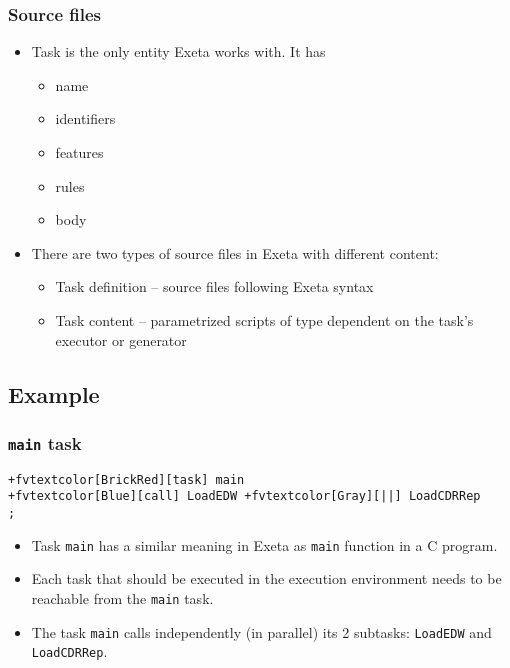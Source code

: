 \documentclass[english,xcolor={dvipsnames}]{beamer}
\begin{document}
\begin{frame}
\frametitle{Source files}
\begin{itemize}
    \item Task is the only entity Exeta works with. It has
    \begin{itemize}
        \item name
        \item identifiers
        \item features
        \item rules
        \item body
    \end{itemize}
    \item There are two types of source files in Exeta with different content:
    \begin{itemize}
        \item Task definition -- source files following Exeta syntax %
        \item Task content -- parametrized scripts of type dependent on the task's executor or generator %
    \end{itemize}
\end{itemize}
\end{frame}

\subsection{Example}

\begin{frame}[fragile]
\frametitle{\texttt{main} task}
\begin{Verbatim}[commandchars=+\[\]]
+fvtextcolor[BrickRed][task] main
+fvtextcolor[Blue][call] LoadEDW +fvtextcolor[Gray][||] LoadCDRRep
;
\end{Verbatim}
\begin{itemize}
    \item Task \verb|main| has a similar meaning in Exeta as \verb|main| function in a C program.
    \item Each task that should be executed in the execution environment needs to be reachable from the \verb|main| task.
    \item The task \verb|main| calls independently (in parallel) its 2 subtasks: \verb|LoadEDW| and \verb|LoadCDRRep|.
\end{itemize}
\end{frame}
\end{document}
